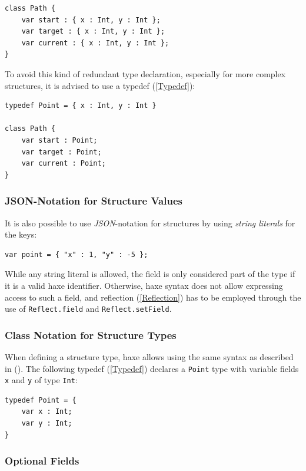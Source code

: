 \documentclass{article}
\newcommand{\type}[1]{\texttt{#1}}
\newcommand{\expr}[1]{\texttt{#1}}
\newcommand{\Fullref}[1]{\nameref{#1} (\Cref{#1})}
\newcommand{\tref}[2]{#1 (\ref{#2})}
\begin{document}
\begin{lstlisting}
class Path {
    var start : { x : Int, y : Int };
    var target : { x : Int, y : Int };
    var current : { x : Int, y : Int };
}
\end{lstlisting}
To avoid this kind of redundant type declaration, especially for more complex structures, it is advised to use a \tref{typedef}{Typedef}:

\begin{lstlisting}
typedef Point = { x : Int, y : Int }

class Path {
    var start : Point;
    var target : Point;
    var current : Point;
}
\end{lstlisting}


\subsubsection{JSON-Notation for Structure Values}
\label{JSON-Notation for Structure Values}

It is also possible to use \emph{JSON}-notation for structures by using \emph{string literals} for the keys:

\begin{lstlisting}
var point = { "x" : 1, "y" : -5 };
\end{lstlisting}
While any string literal is allowed, the field is only considered part of the type if it is a valid haxe identifier. Otherwise, haxe syntax does not allow expressing access to such a field, and \tref{reflection}{Reflection} has to be employed through the use of \expr{Reflect.field} and \expr{Reflect.setField}.


\subsubsection{Class Notation for Structure Types}
\label{Class Notation for Structure Types}

When defining a structure type, haxe allows using the same syntax as described in \Fullref{Class Fields}. The following \tref{typedef}{Typedef} declares a \type{Point} type with variable fields \expr{x} and \expr{y} of type \type{Int}:

\begin{lstlisting}
typedef Point = {
    var x : Int;
    var y : Int;
}
\end{lstlisting}

\subsubsection{Optional Fields}
\end{document}
